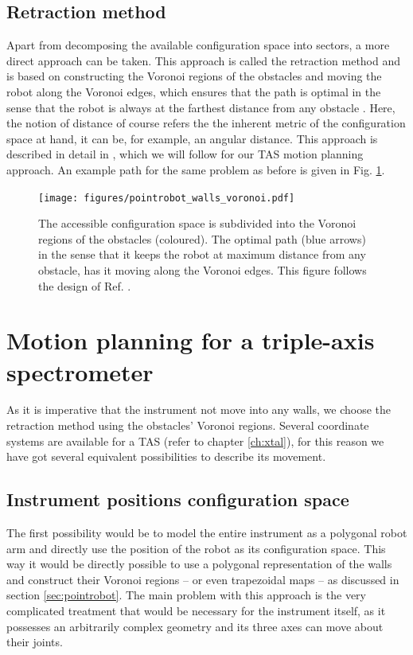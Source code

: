 \subsection{Retraction method}
Apart from decomposing the available configuration space into sectors, a more 
direct approach can be taken. 
This approach is called the retraction method and is based on constructing the 
Voronoi regions of the obstacles and moving the robot along the Voronoi edges, 
which ensures that the path is optimal in the sense that the robot is always at 
the farthest distance from any obstacle \cite[pp. 163 and 304]{Berg2008}.
Here, the notion of distance of course refers the the inherent metric of the configuration space
at hand, it can be, for example, an angular distance.
This approach is described in detail in \cite[Ch. 5.4.3, pp. 247-251]{FUH_geo2020}, which
we will follow for our TAS motion planning approach.
An example path for the same problem as before is given in Fig. \ref{fig:robot_voronoi}.


\begin{figure}[htb]
	\centering
	\texttt{[image: figures/pointrobot\_walls\_voronoi.pdf]}
	\caption[Pathfinding using Voronoi diagrams.]{
		The accessible configuration space is subdivided into the Voronoi regions 
		of the obstacles (coloured). The optimal path (blue arrows) in the sense 
		that it keeps the robot at maximum distance from any obstacle, has it 
		moving along the Voronoi edges. This figure follows the design of
		Ref. \cite[Fig. 5.4.3.1, p. 247]{FUH_geo2020}.}
	\label{fig:robot_voronoi}
\end{figure}



\section{Motion planning for a triple-axis spectrometer}
\label{sec:tasrobot}

As it is imperative that the instrument not move into any walls, we choose the 
retraction method using the obstacles' Voronoi regions.
Several coordinate systems are available for a TAS (refer to chapter \ref{ch:xtal}), 
for this reason we have got several equivalent possibilities to describe its movement. 


\subsection{Instrument positions configuration space}
The first possibility would be to model the entire instrument as a polygonal 
robot arm and directly use the position of the robot as its configuration space. 
This way it would be directly possible to use a polygonal representation of the 
walls and construct their Voronoi regions -- or even trapezoidal maps -- as 
discussed in section \ref{sec:pointrobot}. The main problem with this approach 
is the very complicated treatment that would be necessary for the instrument 
itself, as it possesses an arbitrarily complex geometry and its three axes
can move about their joints.


